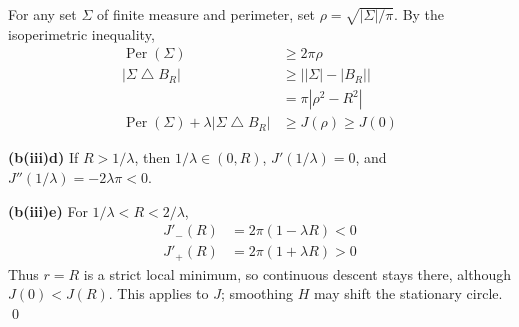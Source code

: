 \documentclass[12pt,letterpaper]{article}
\newcommand{\partlabel}[1]{\par\medskip\noindent\textbf{(#1)}\enspace}
\newcommand{\finish}{\qed\par}
\begin{document}
For any set $\Sigma$ of finite measure and perimeter, set
$\rho=\sqrt{|\Sigma|/\pi}$. By the isoperimetric inequality,
\begin{align*}
 \operatorname{Per}(\Sigma)&\geq2\pi\rho\\
 |\Sigma\mathbin\triangle B_R|
 &\geq\bigl||\Sigma|-|B_R|\bigr|\\
 &=\pi|\rho^2-R^2|\\
 \operatorname{Per}(\Sigma)+\lambda|\Sigma\mathbin\triangle B_R|
 &\geq J(\rho)\geq J(0)
\end{align*}

\partlabel{b(iii)d}
If $R>1/\lambda$, then $1/\lambda\in(0,R)$,
$J'(1/\lambda)=0$, and $J''(1/\lambda)=-2\lambda\pi<0$.

\partlabel{b(iii)e}
For $1/\lambda<R<2/\lambda$,
\begin{align*}
 J'_-(R)&=2\pi(1-\lambda R)<0\\
 J'_+(R)&=2\pi(1+\lambda R)>0
\end{align*}
Thus $r=R$ is a strict local minimum, so continuous descent stays there,
although $J(0)<J(R)$. This applies to $J$; smoothing $H$ may shift the
stationary circle.
\finish
\end{document}
